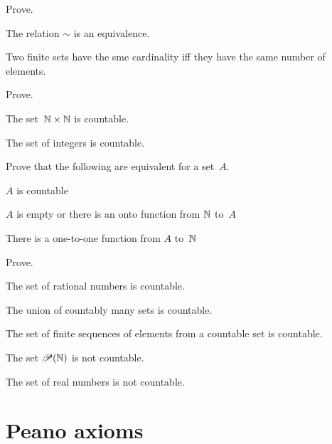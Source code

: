 \documentclass{ibl}
\begin{document}
\begin{ex} Prove.
\begin{exes}
\item The relation $\sim$ is an equivalence.
\item Two finite sets have the sme cardinality iff they have the
  same number of elements.
\end{exes}
\end{ex}

\begin{ex}  Prove.
\begin{exes}
\item The set~$\mathbb{N}\times\mathbb{N}$ is countable.
\item The set of integers is countable.
\end{exes}
\end{ex}

\begin{ex} Prove that the following are equivalent for a set~$A$.
\begin{exes}
\item $A$ is countable
\item $A$ is empty or there is an onto function from $\mathbb{N}$ to~$A$
\item There is a one-to-one function from $A$ to~$\mathbb{N}$    
\end{exes}
\end{ex}

\begin{ex} Prove.
\begin{exes}
\item The set of rational numbers is countable.
\item The union of countably many sets is countable.
\item The set of finite sequences of elements from a countable set is countable.
\end{exes}
\end{ex}

\begin{ex}
\begin{exes}
\item The set $\mathscr{P}(\mathbb{N})$ is not countable.
\item The set of real numbers is not countable.  
\end{exes}
\end{ex}




\appendix
\chapter{Peano axioms}
\newcommand{\axiom}[1]{\textsc{Axiom~#1}\hspace{.5ex}}
\end{document}
